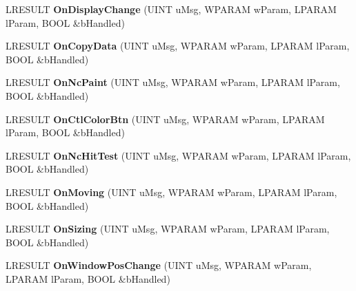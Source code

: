 \begin{DoxyCompactItemize}
\item 
\mbox{\label{class_c_tray_window_aeb96e71d77fc638bb902b26ec9062433}} 
L\+R\+E\+S\+U\+LT {\bfseries On\+Display\+Change} (U\+I\+NT u\+Msg, W\+P\+A\+R\+AM w\+Param, L\+P\+A\+R\+AM l\+Param, B\+O\+OL \&b\+Handled)
\item 
\mbox{\label{class_c_tray_window_a5857455327fc4298617b6971a9ad6c0e}} 
L\+R\+E\+S\+U\+LT {\bfseries On\+Copy\+Data} (U\+I\+NT u\+Msg, W\+P\+A\+R\+AM w\+Param, L\+P\+A\+R\+AM l\+Param, B\+O\+OL \&b\+Handled)
\item 
\mbox{\label{class_c_tray_window_a1a54940fc8ae0f2a7206225b860137b9}} 
L\+R\+E\+S\+U\+LT {\bfseries On\+Nc\+Paint} (U\+I\+NT u\+Msg, W\+P\+A\+R\+AM w\+Param, L\+P\+A\+R\+AM l\+Param, B\+O\+OL \&b\+Handled)
\item 
\mbox{\label{class_c_tray_window_a2d8b3c947e3de720903325f8f96a2777}} 
L\+R\+E\+S\+U\+LT {\bfseries On\+Ctl\+Color\+Btn} (U\+I\+NT u\+Msg, W\+P\+A\+R\+AM w\+Param, L\+P\+A\+R\+AM l\+Param, B\+O\+OL \&b\+Handled)
\item 
\mbox{\label{class_c_tray_window_ad4aa69a8b86a9f8eb33047758345529a}} 
L\+R\+E\+S\+U\+LT {\bfseries On\+Nc\+Hit\+Test} (U\+I\+NT u\+Msg, W\+P\+A\+R\+AM w\+Param, L\+P\+A\+R\+AM l\+Param, B\+O\+OL \&b\+Handled)
\item 
\mbox{\label{class_c_tray_window_a9d1316f0bcd9a234a6f1c32b70565eaa}} 
L\+R\+E\+S\+U\+LT {\bfseries On\+Moving} (U\+I\+NT u\+Msg, W\+P\+A\+R\+AM w\+Param, L\+P\+A\+R\+AM l\+Param, B\+O\+OL \&b\+Handled)
\item 
\mbox{\label{class_c_tray_window_aa6ce8d492fe48e83473fb21705e0f112}} 
L\+R\+E\+S\+U\+LT {\bfseries On\+Sizing} (U\+I\+NT u\+Msg, W\+P\+A\+R\+AM w\+Param, L\+P\+A\+R\+AM l\+Param, B\+O\+OL \&b\+Handled)
\item 
\mbox{\label{class_c_tray_window_a68b79824463f6ff8dedaccc5e0796ec4}} 
L\+R\+E\+S\+U\+LT {\bfseries On\+Window\+Pos\+Change} (U\+I\+NT u\+Msg, W\+P\+A\+R\+AM w\+Param, L\+P\+A\+R\+AM l\+Param, B\+O\+OL \&b\+Handled)
\item 

\end{DoxyCompactItemize}
